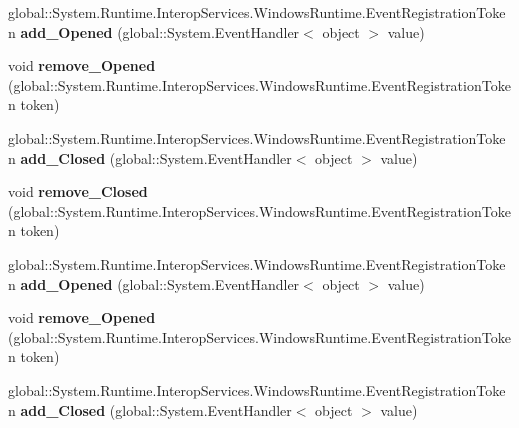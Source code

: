 \begin{DoxyCompactItemize}
global\+::\+System.\+Runtime.\+Interop\+Services.\+Windows\+Runtime.\+Event\+Registration\+Token {\bfseries add\+\_\+\+Opened} (global\+::\+System.\+Event\+Handler$<$ object $>$ value)
\item 
\mbox{\label{interface_windows_1_1_u_i_1_1_xaml_1_1_controls_1_1_i_app_bar_a7b13adf7eea94bab04ff42899a53893e}} 
void {\bfseries remove\+\_\+\+Opened} (global\+::\+System.\+Runtime.\+Interop\+Services.\+Windows\+Runtime.\+Event\+Registration\+Token token)
\item 
\mbox{\label{interface_windows_1_1_u_i_1_1_xaml_1_1_controls_1_1_i_app_bar_ab262c6a2bdf436106c956695a7b223cd}} 
global\+::\+System.\+Runtime.\+Interop\+Services.\+Windows\+Runtime.\+Event\+Registration\+Token {\bfseries add\+\_\+\+Closed} (global\+::\+System.\+Event\+Handler$<$ object $>$ value)
\item 
\mbox{\label{interface_windows_1_1_u_i_1_1_xaml_1_1_controls_1_1_i_app_bar_a4d5a9d418800e1ab130394d9ff7e47eb}} 
void {\bfseries remove\+\_\+\+Closed} (global\+::\+System.\+Runtime.\+Interop\+Services.\+Windows\+Runtime.\+Event\+Registration\+Token token)
\item 
\mbox{\label{interface_windows_1_1_u_i_1_1_xaml_1_1_controls_1_1_i_app_bar_aecc047b50b36b80b2863330dfdd6b5b1}} 
global\+::\+System.\+Runtime.\+Interop\+Services.\+Windows\+Runtime.\+Event\+Registration\+Token {\bfseries add\+\_\+\+Opened} (global\+::\+System.\+Event\+Handler$<$ object $>$ value)
\item 
\mbox{\label{interface_windows_1_1_u_i_1_1_xaml_1_1_controls_1_1_i_app_bar_a7b13adf7eea94bab04ff42899a53893e}} 
void {\bfseries remove\+\_\+\+Opened} (global\+::\+System.\+Runtime.\+Interop\+Services.\+Windows\+Runtime.\+Event\+Registration\+Token token)
\item 
\mbox{\label{interface_windows_1_1_u_i_1_1_xaml_1_1_controls_1_1_i_app_bar_ab262c6a2bdf436106c956695a7b223cd}} 
global\+::\+System.\+Runtime.\+Interop\+Services.\+Windows\+Runtime.\+Event\+Registration\+Token {\bfseries add\+\_\+\+Closed} (global\+::\+System.\+Event\+Handler$<$ object $>$ value)

\end{DoxyCompactItemize}
